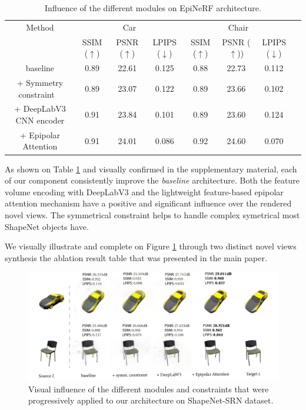 \begin{table}[htp!]
\caption{Influence of the different modules on EpiNeRF architecture.}
\label{tab:ablation}
\begin{center}
\centering
\begin{adjustbox}{width=\textwidth}
\begin{tabular}[h]{c||ccccccc}
\hline
Method & \multicolumn{3}{c}{Car} & \multicolumn{3}{c}{Chair} \\
 &  SSIM ($\uparrow$) & PSNR ($\uparrow$) & LPIPS ($\downarrow$) & SSIM ($\uparrow$) & PSNR ($\uparrow$)) & LPIPS ($\downarrow$)\\[.5pt]
\hline
baseline & 0.89 & 22.61 & 0.125 & 0.88 & 22.73 & 0.112  \\[1.5pt]
\hline 
+ Symmetry constraint ~\citep{li2022symmnerf}  & 0.89 & 23.07  & 0.122 & 0.89 & 23.66 & 0.102 \\
+ DeepLabV3 CNN encoder  & 0.91 & 23.84 & 0.101 & 0.89 & 23.60  & 0.124  \\
+ Epipolar Attention  & \cellcolor{red!25}0.91 & \cellcolor{red!25}24.01 &\cellcolor{red!25}0.086 & \cellcolor{red!25}0.92 &  \cellcolor{red!25}24.60 &\cellcolor{red!25}0.070 \\
\end{tabular}
\end{adjustbox}
\end{center}

\end{table}

As shown on Table \ref{tab:ablation} and visually confirmed in the supplementary material, each of our component consistently improve the \textit{baseline} architecture. Both the feature volume encoding with DeepLabV3 and the lightweight feature-based epipolar attention mechanism have a positive and significant influence over the rendered novel views. The symmetrical constraint helps to handle complex symetrical most ShapeNet objects have.  

We visually illustrate and complete on Figure \ref{fig:ablation} through two distinct novel views synthesis the ablation result table that was presented in the main paper. \newline 

\begin{figure}[h!]
    \begin{center}
  \includegraphics[width=\linewidth]{images/epinerf/supp_ablation_illustration.png}
  \caption{Visual influence of the different modules and constraints that were progressively applied to our architecture on ShapeNet-SRN dataset.}
  \label{fig:ablation}
  \end{center}
\end{figure}  

